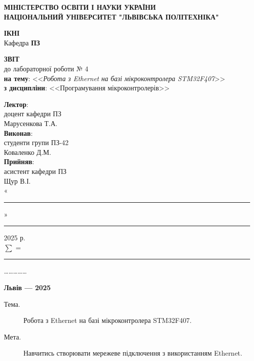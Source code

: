 \documentclass[oneside,14pt]{extarticle}
\newcommand\subject{Програмування мікроконтролерів}
\newcommand\lecturer{доцент кафедри ПЗ\\Марусенкова Т.А.}
\newcommand\teacher{асистент кафедри ПЗ\\Щур В.І.}
\newcommand\mygroup{ПЗ-42}
\newcommand\lab{4}
\newcommand\theme{Робота з Ethernet на базі мікроконтролера STM32F407}
\newcommand\purpose{Навчитись створювати мережеве підключення з використанням Ethernet}
\begin{document}
\begin{normalsize}
	\begin{titlepage}
		\thispagestyle{empty}
		\begin{center}
			\textbf{МІНІСТЕРСТВО ОСВІТИ І НАУКИ УКРАЇНИ\\
				НАЦІОНАЛЬНИЙ УНІВЕРСИТЕТ "ЛЬВІВСЬКА ПОЛІТЕХНІКА"}
		\end{center}
		\begin{flushright}
			\textbf{ІКНІ}\\
			Кафедра \textbf{ПЗ}
		\end{flushright}
		\vspace{80pt}
		\begin{center}
			\textbf{ЗВІТ}\\
			\vspace{10pt}
			до лабораторної роботи № \lab\\
			\textbf{на тему}: <<\textit{\theme}>>\\
			\textbf{з дисципліни}: <<\subject>>
		\end{center}
		\vspace{80pt}
		\begin{flushright}
			
			\textbf{Лектор}:\\
			\lecturer\\
			\vspace{28pt}
			\textbf{Виконав}:\\
			
			студенти групи \mygroup\\
			Коваленко Д.М.\\
			\vspace{28pt}
			\textbf{Прийняв}:\\
			
			\teacher\\
			
			\vspace{28pt}
			«\rule{1cm}{0.15mm}» \rule{1.5cm}{0.15mm} 2025 р.\\
			$\sum$ = \rule{1cm}{0.15mm}……………\\
			
		\end{flushright}
		\vspace{\fill}
		\begin{center}
			\textbf{Львів — 2025}
		\end{center}
	\end{titlepage}
		
	\begin{description}
		\item[Тема.] \theme.
		\item[Мета.] \purpose.
	\end{description}


\end{normalsize}
\end{document}
